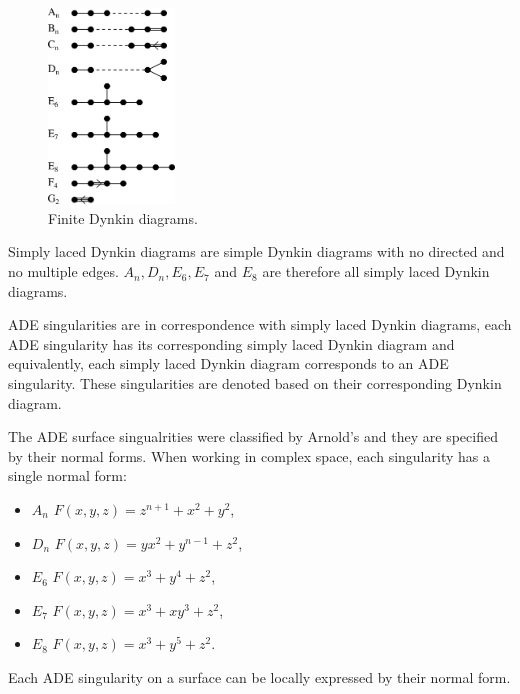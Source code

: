 \begin{figure}
    \centerline{\includegraphics[width=0.3\textwidth]{images/img3}}
    \caption[Finite Dynkin diagrams]
    {Finite Dynkin diagrams\cite{wikidynkindiagram}.}
    \label{img:3}
\end{figure}

Simply laced Dynkin diagrams are simple Dynkin diagrams with no directed
and no multiple edges. $A_n, D_n, E_6, E_7$ and $E_8$ are therefore all
simply laced Dynkin diagrams.

ADE singularities are in correspondence with simply laced Dynkin
diagrams, each ADE singularity has its corresponding simply laced Dynkin
diagram and equivalently, each simply laced Dynkin diagram corresponds
to an ADE singularity. These singularities are denoted based on their
corresponding Dynkin diagram.

The ADE surface singualrities were classified by Arnold's
\cite{arnol1972normal} and they are specified by their normal forms.
When working in complex space, each singularity has a single normal form:
\begin{itemize}
    \item $A_n$ \hspace{5mm} $F(x,y,z)=z^{n+1}+x^2+y^2$,
    \item $D_n$ \hspace{5mm} $F(x,y,z)=yx^2+y^{n-1}+z^2$,
    \item $E_6$ \hspace{5mm} $F(x,y,z)=x^3+y^4+z^2$,
    \item $E_7$ \hspace{5mm} $F(x,y,z)=x^3+xy^3+z^2$,
    \item $E_8$ \hspace{5mm} $F(x,y,z)=x^3+y^5+z^2$.
\end{itemize}

Each ADE singularity on a surface can be locally expressed by their
normal form.

